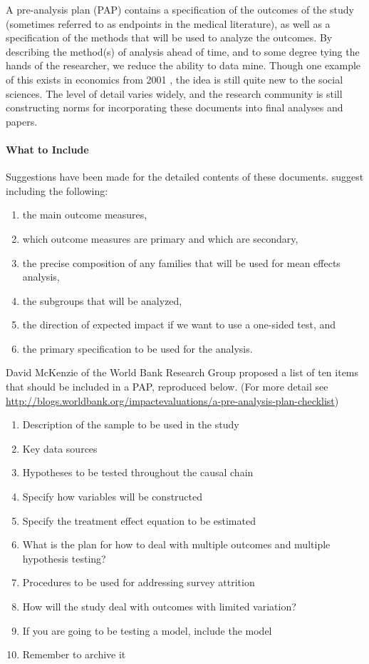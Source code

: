 \documentclass[12pt] {article}
\begin{document}
A pre-analysis plan (PAP) contains a specification of the outcomes of the study (sometimes referred to as endpoints in the medical literature), as well as a specification of the methods that will be used to analyze the outcomes. By describing the
method(s) of analysis ahead of time, and to some degree tying the hands
of the researcher, we reduce the ability to data mine. Though one
example of this exists in economics from 2001 \citep{neumark_employment_2001}, the idea
is still quite new to the social sciences. The level of detail varies
widely, and the research community is still constructing norms for
incorporating these documents into final analyses and papers.

\paragraph{What to Include}
Suggestions have been made for the detailed contents of these documents.
\cite{glennerster_running_2013} suggest including the following:

\begin{enumerate}
\def\labelenumi{\arabic{enumi}.}
\item
  the main outcome measures,
\item
  which outcome measures are primary and which are secondary,
\item
  the precise composition of any families that will be used for mean
  effects analysis,
\item
  the subgroups that will be analyzed,
\item
  the direction of expected impact if we want to use a one-sided test,
  and
\item
  the primary specification to be used for the analysis.
\end{enumerate}
David McKenzie of the World Bank Research Group proposed a list of ten
items that should be included in a PAP, reproduced below. (For more
detail see
\url{http://blogs.worldbank.org/impactevaluations/a-pre-analysis-plan-checklist})

\begin{enumerate}
\item
  Description of the sample to be used in the study
\item
  Key data sources
\item
  Hypotheses to be tested throughout the causal chain
\item
  Specify how variables will be constructed
\item
  Specify the treatment effect equation to be estimated
\item
  What is the plan for how to deal with multiple outcomes and multiple
  hypothesis testing?
\item
  Procedures to be used for addressing survey attrition
\item
  How will the study deal with outcomes with limited variation?
\item
  If you are going to be testing a model, include the model
\item
  Remember to archive it
\end{enumerate}
\end{document}
